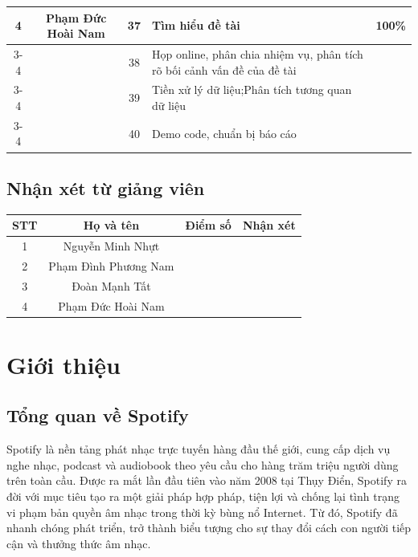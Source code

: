 \documentclass{../hcmut-report}
\begin{document}
\begin{longtable}{|c|c|c|p{5cm}|c|}
\multirow{4}{*}{4} & \multirow{4}{*}{Phạm Đức Hoài Nam} 
    & 37 & Tìm hiểu đề tài & \multirow{4}{*}{100\%} \\ \cline{3-4}
& & 38 & Họp online, phân chia nhiệm vụ, phân tích rõ bối cảnh vấn đề của đề tài & \\ \cline{3-4}
& & 39 & Tiền xử lý dữ liệu;Phân tích tương quan dữ liệu & \\ \cline{3-4}
& & 40 & Demo code, chuẩn bị báo cáo & \\ \hline

\end{longtable}

\subsection*{Nhận xét từ giảng viên}

  \begin{tabular}{|c|c|c|c|}
    \hline
    \textbf{STT} & \textbf{Họ và tên} & \textbf{Điểm số} & \textbf{Nhận xét} \\
    \hline
    1 &  Nguyễn Minh Nhựt   & \hspace{1cm} & \hspace{7.5cm} \\    \hline
    2 & Phạm Đình Phương Nam &  &  \\     \hline
    3 & Đoàn Mạnh Tất  &  &  \\       \hline
    4 & Phạm Đức Hoài Nam  &  &  \\ \hline 

  \end{tabular}



\clearpage
{}
\tableofcontents
\clearpage
{}
\setcounter{page}{1}

\setcounter{section}{0}

\section{ Giới thiệu}
\subsection{Tổng quan về Spotify }
Spotify là nền tảng phát nhạc trực tuyến hàng đầu thế giới, cung cấp dịch vụ nghe nhạc, podcast và audiobook theo yêu cầu cho hàng trăm triệu người dùng trên toàn cầu. Được ra mắt lần đầu tiên vào năm 2008 tại Thụy Điển, Spotify ra đời với mục tiêu tạo ra một giải pháp hợp pháp, tiện lợi và chống lại tình trạng vi phạm bản quyền âm nhạc trong thời kỳ bùng nổ Internet. Từ đó, Spotify đã nhanh chóng phát triển, trở thành biểu tượng cho sự thay đổi cách con người tiếp cận và thưởng thức âm nhạc.\\
\end{document}

